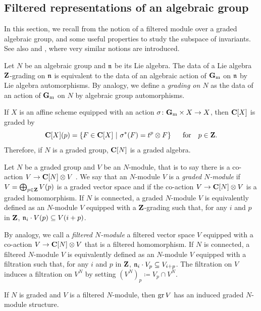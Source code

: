 \subsection{Filtered representations of an algebraic group}

\label{subsection:filtered-representation}

In this section, we recall from \cite{juillard2025phd} the notion of a filtered module over a graded algebraic group, and some useful properties to study the subspace of invariants. See also \cite[Section 2.4]{hamilton2026relative} and \cite[Section 3.1]{hoskins2025moduli}, where very similar notions are introduced.

Let $N$ be an algebraic group and $\mathfrak n$ be its Lie algebra. The data of a Lie algebra $\mathbf{Z}$-grading on $\mathfrak n$ is equivalent to the data of an algebraic action of $\mathbf{G}_\mathrm{m}$ on $\mathfrak n$ by Lie algebra automorphisms. By analogy, we define a \emph{grading on $N$} as the data of an action of $\mathbf{G}_\mathrm{m}$ on $N$ by algebraic group automorphisms.


If $X$ is an affine scheme equipped with an action $\sigma \colon \mathbf{G}_\mathrm{m} \times X \rightarrow X$, then $\mathbf{C}[X]$ is graded by
$$ \mathbf{C}[X](p) = \{F \in \mathbf{C}[X] ~ | ~  \sigma^*(F) = t^p \otimes F \} ~ \quad ~ \text{for} \quad p \in \mathbf{Z}. $$
Therefore, if $N$ is a graded group, $\mathbf{C}[N]$ is a graded algebra.

Let $N$ be a graded group and $V$ be an $N$-module, that is to say there is a co-action $V \rightarrow \mathbf{C}[N] \otimes V$ \cite[Chapter 4, Section a]{milne2017algebraic}. We say that an $N$-module $V$ is a \emph{graded $N$-module} if $V = \bigoplus_{p \in \mathbf{Z}} V(p)$ is a graded vector space and if the co-action $V \rightarrow \mathbf{C}[N] \otimes V$ is a graded homomorphism. If $N$ is connected, a graded $N$-module $V$ is equivalently defined as an $N$-module $V$ equipped with a $\mathbf{Z}$-grading such that, for any $i$ and $p$ in $\mathbf{Z}$, $\mathfrak n_i \cdot V(p) \subseteq V(i + p)$.

By analogy, we call a \emph{filtered $N$-module} a filtered vector space $V$ equipped with a co-action $V \rightarrow \mathbf{C}[N] \otimes V$ that is a filtered homomorphism. If $N$ is connected, a filtered $N$-module $V$ is equivalently defined as an $N$-module $V$ equipped with a filtration such that, for any $i$ and $p$ in $\mathbf{Z}$, $\mathfrak n_i \cdot V_p \subseteq V_{i + p}$. The filtration on $V$ induces a filtration on $V^N$ by setting $(V^N)_p \coloneq V_p \cap V^N$.

\begin{lemma} \label{lemma:gr-action}
	If $N$ is graded and $V$ is a filtered $N$-module, then $\operatorname{gr} V$ has an induced graded $N$-module structure.
\end{lemma}

